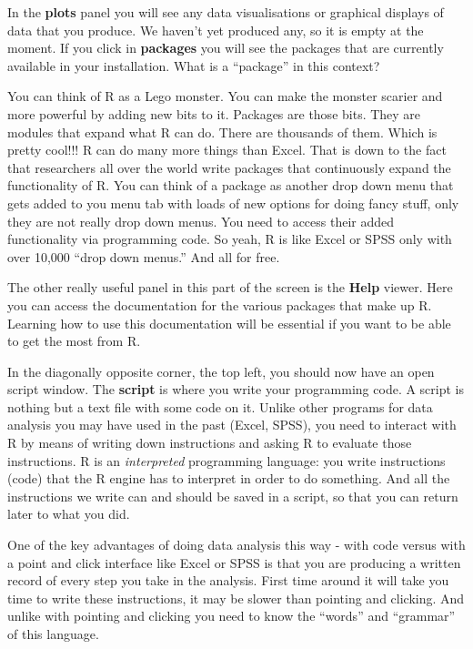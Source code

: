 \documentclass[]{book}
\begin{document}
In the \textbf{plots} panel you will see any data visualisations or graphical displays of data that you produce. We haven't yet produced any, so it is empty at the moment. If you click in \textbf{packages} you will see the packages that are currently available in your installation. What is a ``package'' in this context?

You can think of R as a Lego monster. You can make the monster scarier and more powerful by adding new bits to it. Packages are those bits. They are modules that expand what R can do. There are thousands of them. Which is pretty cool!!! R can do many more things than Excel. That is down to the fact that researchers all over the world write packages that continuously expand the functionality of R.
You can think of a package as another drop down menu that gets added to you menu tab with loads of new options for doing fancy stuff, only they are not really drop down menus. You need to access their added functionality via programming code. So yeah, R is like Excel or SPSS only with over 10,000 ``drop down menus.'' And all for free.

The other really useful panel in this part of the screen is the \textbf{Help} viewer. Here you can access the documentation for the various packages that make up R. Learning how to use this documentation will be essential if you want to be able to get the most from R.

In the diagonally opposite corner, the top left, you should now have an open script window. The \textbf{script} is where you write your programming code. A script is nothing but a text file with some code on it. Unlike other programs for data analysis you may have used in the past (Excel, SPSS), you need to interact with R by means of writing down instructions and asking R to evaluate those instructions. R is an \emph{interpreted} programming language: you write instructions (code) that the R engine has to interpret in order to do something. And all the instructions we write can and should be saved in a script, so that you can return later to what you did.

One of the key advantages of doing data analysis this way - with code versus with a point and click interface like Excel or SPSS is that you are producing a written record of every step you take in the analysis. First time around it will take you time to write these instructions, it may be slower than pointing and clicking. And unlike with pointing and clicking you need to know the ``words'' and ``grammar'' of this language.
\end{document}
